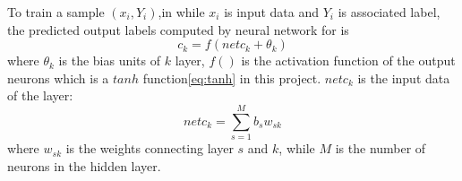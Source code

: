 To train a sample $(x_{i}, Y_{i})$,in while $x_{i}$ is input data and $Y_{i}$ is associated label, the predicted output labels computed by neural network for is
\begin{equation}\label{eq:MultiLabelActivation}
c_{k} = f(netc_{k} + \theta_{k})
\end{equation}
where $\theta_{k}$ is the bias units of $k$ layer, $f()$ is the activation function of the output neurons which is a $tanh$ function\ref{eq:tanh} in this project. $netc_{k}$ is the input data of the layer:
\begin{equation}\label{eq:MultiLabel}
netc_{k} = \sum_{s=1}^M b_{s}w_{sk}
\end{equation}
where $w_{sk}$ is the weights connecting layer $s$ and $k$, while $M$ is the number of neurons in the hidden layer.

